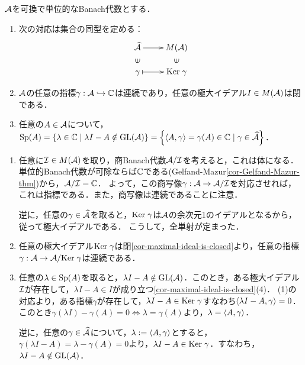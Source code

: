 \documentclass[uplatex,dvipdfmx]{jsreport}
\begin{document}
\begin{proposition}[極大スペクトルとの対応]\label{prop-correspondence-between-maximal-spectrum-and-characters}
    $\mathcal{A}$を可換で単位的なBanach代数とする．
    \begin{enumerate}
        \item 次の対応は集合の同型を定める：
        \[\xymatrix@R-2pc{
            \wh{\A}\ar[r]&M(\A)\\
            \rotatebox[origin=c]{90}{$\in$}&\rotatebox[origin=c]{90}{$\in$}\\
            \gamma\ar@{|->}[r]&\Ker\gamma
        }\]
        \item $\mathcal{A}$の任意の指標$\gamma:\mathcal{A}\hookrightarrow\mathbb{C}$は連続であり，任意の極大イデアル$I\in M(\mathcal{A})$は閉である．
        \item 任意の$A\in\mathcal{A}$について，$\mathrm{Sp}(A)=\left\{\lambda\in\mathbb{C}\mid\lambda I-A\notin\mathrm{GL}(\mathcal{A})\right\}=\left\{\langle A,\gamma\rangle=\gamma(A)\in\mathbb{C}\mid\gamma\in\widehat{\mathcal{A}}\right\}$．
    \end{enumerate}
\end{proposition}
\begin{Proof}\mbox{}
    \begin{enumerate}
        \item 任意に$\mathcal{I}\in M(\mathcal{A})$を取り，商Banach代数$\mathcal{A}/\mathcal{I}$を考えると，これは体になる．単位的Banach代数が可除ならば$\mathbb{C}$である(Gelfand-Mazur\ref{cor-Gelfand-Mazur-thm})から，$\mathcal{A}/\mathcal{I}=\mathbb{C}$．
        よって，この商写像$\gamma:\mathcal{A}\to\mathcal{A}/\mathcal{I}$を対応させれば，これは指標である．また，商写像は連続であることに注意．
        
        逆に，任意の$\gamma\in\widehat{\mathcal{A}}$を取ると，$\mathrm{Ker}\;\gamma$は$\mathcal{A}$の余次元1のイデアルとなるから，従って極大イデアルである．
        こうして，全単射が定まった．
        \item 任意の極大イデアル$\mathrm{Ker}\;\gamma$は閉\ref{cor-maximal-ideal-is-closed}より，任意の指標$\gamma:\mathcal{A}\to\mathcal{A}/\mathrm{Ker}\;\gamma$は連続である．
        \item 任意の$\lambda\in\mathrm{Sp}(A)$を取ると，$\lambda I-A\notin\mathrm{GL}(\mathcal{A})$．このとき，ある極大イデアル$\mathcal{I}$が存在して，$\lambda I-A\in I$が成り立つ\ref{cor-maximal-ideal-is-closed}(4)．
        (1)の対応より，ある指標$\gamma$が存在して，$\lambda I-A\in\mathrm{Ker}\;\gamma$すなわち$\langle\lambda I-A,\gamma\rangle=0$．
        このとき$\gamma(\lambda I)-\gamma(A)=0\Leftrightarrow\lambda=\gamma(A)$より，$\lambda=\langle A,\gamma\rangle$．

        逆に，任意の$\gamma\in\widehat{\mathcal{A}}$について，$\lambda:=\langle A,\gamma\rangle$とすると，$\gamma(\lambda I-A)=\lambda-\gamma(A)=0$より，$\lambda I-A\in\mathrm{Ker}\;\gamma$．すなわち，$\lambda I-A\notin\mathrm{GL}(\mathcal{A})$．
    \end{enumerate}
\end{Proof}
\end{document}
